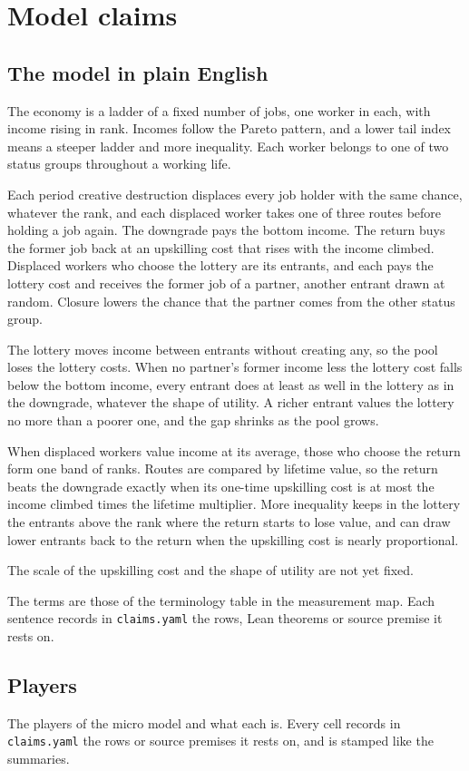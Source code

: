 \documentclass[10pt]{article}
\begin{document}
\section{Model claims}
\subsection*{The model in plain English}
The economy is a ladder of a fixed number of jobs, one worker in each, with income rising in rank. Incomes follow the Pareto pattern, and a lower tail index means a steeper ladder and more inequality. Each worker belongs to one of two status groups throughout a working life.

Each period creative destruction displaces every job holder with the same chance, whatever the rank, and each displaced worker takes one of three routes before holding a job again. The downgrade pays the bottom income. The return buys the former job back at an upskilling cost that rises with the income climbed. Displaced workers who choose the lottery are its entrants, and each pays the lottery cost and receives the former job of a partner, another entrant drawn at random. Closure lowers the chance that the partner comes from the other status group.

The lottery moves income between entrants without creating any, so the pool loses the lottery costs. When no partner's former income less the lottery cost falls below the bottom income, every entrant does at least as well in the lottery as in the downgrade, whatever the shape of utility. A richer entrant values the lottery no more than a poorer one, and the gap shrinks as the pool grows.

When displaced workers value income at its average, those who choose the return form one band of ranks. Routes are compared by lifetime value, so the return beats the downgrade exactly when its one-time upskilling cost is at most the income climbed times the lifetime multiplier. More inequality keeps in the lottery the entrants above the rank where the return starts to lose value, and can draw lower entrants back to the return when the upskilling cost is nearly proportional.

The scale of the upskilling cost and the shape of utility are not yet fixed.

The terms are those of the terminology table in the measurement map. Each sentence records in \texttt{claims.yaml} the rows, Lean theorems or source premise it rests on.

\subsection*{Players}
The players of the micro model and what each is. Every cell records in \texttt{claims.yaml} the rows or source premises it rests on, and is stamped like the summaries.
\end{document}
